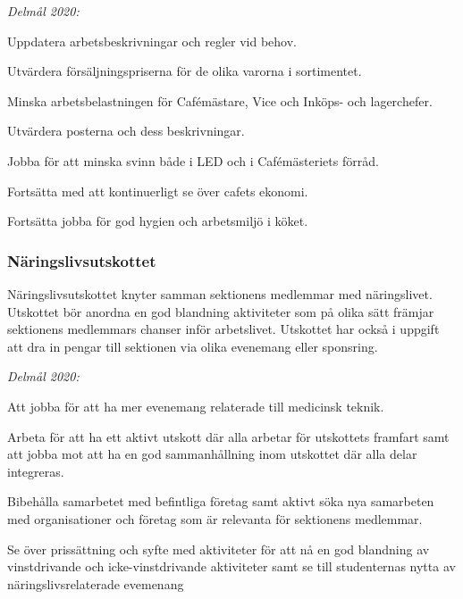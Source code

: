 \documentclass[../_main/handlingar.tex]{subfiles}
\begin{document}
\emph{Delmål 2020:}
\begin{dashlist}
	\item Uppdatera arbetsbeskrivningar och regler vid behov. 
	\item Utvärdera försäljningspriserna för de olika varorna i sortimentet. 
	\item Minska arbetsbelastningen för Cafémästare, Vice och Inköps- och lagerchefer.
	\item Utvärdera posterna och dess beskrivningar.
	\item Jobba för att minska svinn både i LED och i Cafémästeriets förråd.
    \item Fortsätta med att kontinuerligt se över cafets ekonomi. 
    \item Fortsätta jobba för god hygien och arbetsmiljö i köket.
\end{dashlist}

\subsubsection*{Näringslivsutskottet}
Näringslivsutskottet knyter samman sektionens medlemmar med näringslivet. Utskottet bör anordna en god blandning aktiviteter som på olika sätt främjar sektionens medlemmars chanser inför arbetslivet. Utskottet har också i uppgift att dra in pengar till sektionen via olika evenemang eller sponsring. 

\emph{Delmål 2020:}
\begin{dashlist}
	\item Att jobba för att ha mer evenemang relaterade till medicinsk teknik.
	\item Arbeta för att ha ett aktivt utskott där alla arbetar för utskottets framfart samt att jobba mot att ha en god sammanhållning inom utskottet där alla delar integreras.
	\item Bibehålla samarbetet med befintliga företag samt aktivt söka nya samarbeten med organisationer och företag som är relevanta för sektionens medlemmar.
	\item Se över prissättning och syfte med aktiviteter för att nå en god blandning av vinstdrivande och icke-vinstdrivande aktiviteter samt se till studenternas nytta av näringslivsrelaterade evemenang
\end{dashlist}

\newpage
\end{document}
